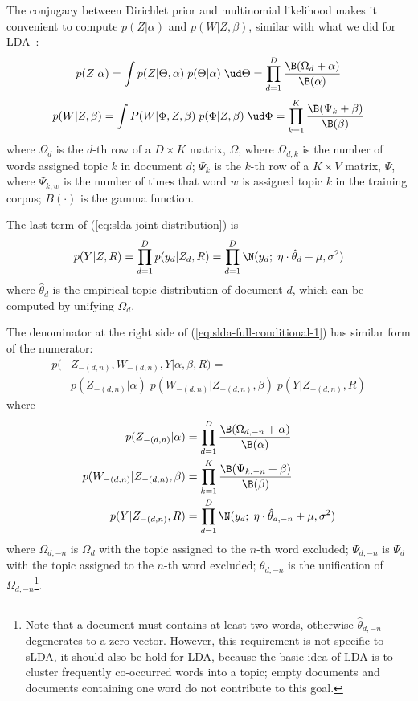 The conjugacy between Dirichlet prior and multinomial likelihood makes
it convenient to compute $p(Z|\alpha)$ and $p(W|Z,\beta)$, similar
with what we did for LDA~\cite{heinrich}:
\begin{equation}
  \label{eq:gen-Z}
  p(Z|\alpha)
  =
  \int p(Z|\Theta,\alpha) \; p(\Theta|\alpha) \; \ud\Theta
  =
  \prod_{d=1}^D
  \frac{\B(\Omega_d+\alpha)}{\B(\alpha)}
\end{equation}
\begin{equation}
  \label{eq:gen-W}
  p(W|Z,\beta)
  =
  \int P(W|\Phi,Z,\beta) \; p(\Phi|Z,\beta) \; \ud\Phi
  =
  \prod_{k=1}^K
  \frac{\B(\Psi_k+\beta)}{\B(\beta)}
\end{equation}
where $\Omega_d$ is the $d$-th row of a $D\times{}K$ matrix, $\Omega$,
where $\Omega_{d,k}$ is the number of words assigned topic $k$ in
document $d$; $\Psi_k$ is the $k$-th row of a $K\times{}V$ matrix,
$\Psi$, where $\Psi_{k,w}$ is the number of times that word $w$ is
assigned topic $k$ in the training corpus; $B(\cdot)$ is the gamma
function.

The last term of (\ref{eq:slda-joint-distribution}) is
\begin{equation}
  \label{eq:gen-rate}
  p(Y|Z,R) =
  \prod_{d=1}^D p(y_d|Z_d,R) =
  \prod_{d=1}^D \N(y_d; \; \eta \cdot \hat{\theta}_d + \mu, \sigma^2)
\end{equation}
where $\hat{\theta}_d$ is the empirical topic distribution of document
$d$, which can be computed by unifying $\Omega_d$.

The denominator at the right side of
(\ref{eq:slda-full-conditional-1}) has similar form of the numerator:
\begin{equation}
  \label{eq:slda-sub-joint-distribution}
  \begin{split}
    p(&Z_{-(d,n)},W_{-(d,n)},Y|\alpha,\beta,R) = \\
    &p(Z_{-(d,n)}|\alpha) \; p(W_{-(d,n)}|Z_{-(d,n)},\beta) \; p(Y|Z_{-(d,n)},R)
  \end{split}
\end{equation}
where
\begin{equation}
  \label{eq:gen-sub}
  \begin{split}
  p(Z_{-(d,n)}|\alpha)
  &=
  \prod_{d=1}^D
  \frac{\B(\Omega_{d,-n}+\alpha)}{\B(\alpha)}
  \\
  p(W_{-(d,n)}|Z_{-(d,n)},\beta)
  &=
  \prod_{k=1}^K
  \frac{\B(\Psi_{k,-n}+\beta)}{\B(\beta)}
  \\
  p(Y|Z_{-(d,n)},R)
  &=
  \prod_{d=1}^D \N(y_d; \; \eta \cdot \hat{\theta}_{d,-n} + \mu, \sigma^2)
  \end{split}
\end{equation}
where $\Omega_{d,-n}$ is $\Omega_d$ with the topic assigned to the
$n$-th word excluded; $\Psi_{d,-n}$ is $\Psi_d$ with the topic
assigned to the $n$-th word excluded; $\theta_{d,-n}$ is the
unification of $\Omega_{d,-n}$\footnote{Note that a document must
  contains at least two words, otherwise $\hat{\theta}_{d,-n}$
  degenerates to a zero-vector.  However, this requirement is not
  specific to sLDA, it should also be hold for LDA, because the basic
  idea of LDA is to cluster frequently co-occurred words into a topic;
  empty documents and documents containing one word do not contribute
  to this goal.}.

